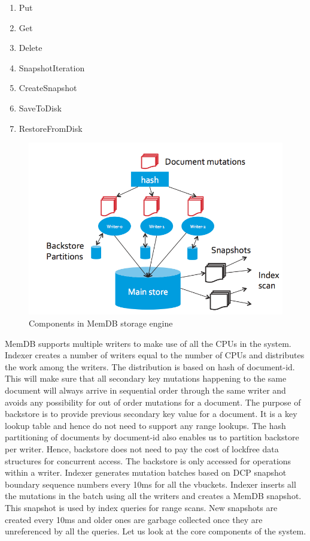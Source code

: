 \documentclass{vldb}
\begin{document}
\begin{enumerate}
  \item Put
  \item Get
  \item Delete
  \item SnapshotIteration
  \item CreateSnapshot
  \item SaveToDisk
  \item RestoreFromDisk
\end{enumerate}

\begin{figure}
\centering
\includegraphics[scale=0.3]{images/fig-1}
\caption{Components in MemDB storage engine}
\label{fig:engine}
\end{figure}

MemDB supports multiple writers to make use of all the CPUs in the system. Indexer creates a number of writers equal to the number of CPUs and distributes the work among the writers. The distribution is based on hash of document-id. This will make sure that all secondary key mutations happening to the same document will always arrive in sequential order through the same writer and avoids any possibility for out of order mutations for a document. The purpose of backstore is to provide previous secondary key value for a document. It is a key lookup table and hence do not need to support any range lookups. The hash partitioning of documents by document-id also enables us to partition backstore per writer. Hence, backstore does not need to pay the cost of lockfree data structures for concurrent access. The backstore is only accessed for operations within a writer. Indexer generates mutation batches based on DCP snapshot boundary sequence numbers every 10ms for all the vbuckets. Indexer inserts all the mutations in the batch using all the writers and creates a MemDB snapshot. This snapshot is used by index queries for range scans. New snapshots are created every 10ms and older ones are garbage collected once they are unreferenced by all the queries. Let us look at the core components of the system.
\end{document}
